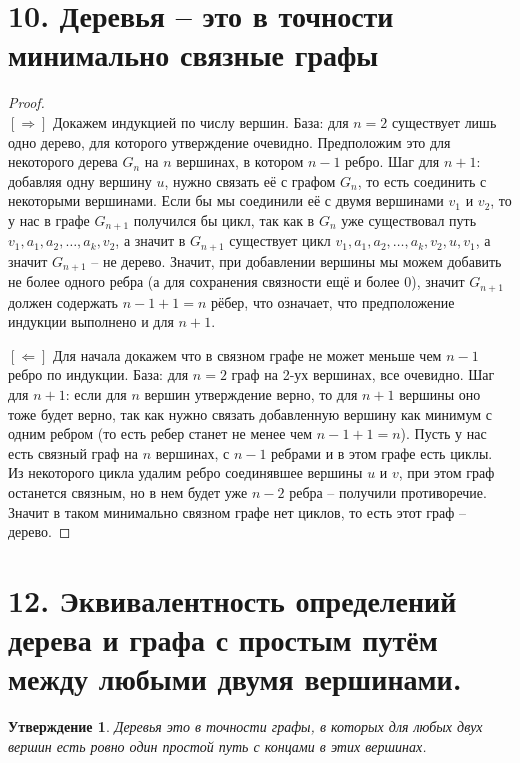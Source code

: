 \documentclass[a4paper,12pt]{article}
\newtheorem*{Statements}{Утверждение}
\begin{document}
    \section*{10. Деревья -- это в точности минимально связные графы}
    \begin{proof}\ \\
        $[\Rightarrow]$ Докажем индукцией по числу вершин. База: для $n = 2$ существует лишь одно дерево, для которого утверждение очевидно. Предположим это для некоторого дерева $G_{n}$ на $n$ вершинах, в котором $n - 1$ ребро. Шаг для $n + 1$: добавляя одну вершину $u$, нужно связать её с графом $G_{n}$, то есть соединить с некоторыми вершинами. Если бы мы соединили её с двумя вершинами $v_{1}$ и $v_{2}$, то у нас в графе $G_{n+1}$ получился бы цикл, так как в $G_{n}$ уже существовал путь $v_{1}, a_{1}, a_{2},\ldots, a_{k}, v_{2}$, а значит в $G_{n+1}$ существует цикл $v_{1}, a_{1}, a_{2},\ldots, a_{k}, v_{2}, u, v_{1}$, а значит $G_{n+1}$ -- не дерево. Значит, при добавлении вершины мы можем добавить не более одного ребра (а для сохранения связности ещё и более 0), значит $G_{n+1}$ должен содержать $n - 1 + 1 = n$ рёбер, что означает, что предположение индукции выполнено и для $n + 1$.
        
        \noindent$[\Leftarrow]$ Для начала докажем что в связном графе не может меньше чем $n - 1$ ребро по индукции. База: для $n = 2$ граф на 2-ух вершинах, все очевидно. Шаг для $n + 1$: если для $n$ вершин утверждение верно, то для $n + 1$ вершины оно тоже будет верно, так как нужно связать добавленную вершину как минимум с одним ребром (то есть ребер станет не менее чем $n - 1 + 1 = n$). Пусть у нас есть связный граф на $n$ вершинах, с $n - 1$ ребрами и в этом графе есть циклы. Из некоторого цикла удалим ребро соединявшее вершины $u$ и $v$, при этом граф останется связным, но в нем будет уже $n - 2$ ребра -- получили противоречие. Значит в таком минимально связном графе нет циклов, то есть этот граф -- дерево.
    \end{proof}

    \section*{12. Эквивалентность определений дерева и графа с простым путём
    между любыми двумя вершинами.}
    \begin{Statements}
        Деревья это в точности графы, в которых для любых двух вершин есть ровно
        один простой путь с концами в этих вершинах.
    \end{Statements}
\end{document}
